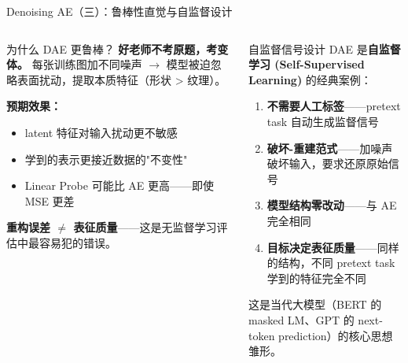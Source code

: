 \documentclass[aspectratio=169]{ctexbeamer}
\begin{document}
\begin{frame}[shrink=10]{Denoising AE（三）：鲁棒性直觉与自监督设计}
\small

\begin{columns}[T]
\begin{alertblock}{为什么 DAE 更鲁棒？}
\footnotesize
\textbf{好老师不考原题，考变体。} 每张训练图加不同噪声 $\to$ 模型被迫忽略表面扰动，提取本质特征（形状 > 纹理）。

\textbf{预期效果：}
\begin{itemize}
  \item latent 特征对输入扰动更不敏感
  \item 学到的表示更接近数据的"不变性"
  \item Linear Probe 可能比 AE 更高——即使 MSE 更差
\end{itemize}

\textbf{重构误差 $\neq$ 表征质量}——这是无监督学习评估中最容易犯的错误。
\end{alertblock}

\begin{block}{自监督信号设计}
\footnotesize
DAE 是\textbf{自监督学习 (Self-Supervised Learning)} 的经典案例：

\begin{enumerate}
  \item \textbf{不需要人工标签}——pretext task 自动生成监督信号
  \item \textbf{破坏-重建范式}——加噪声破坏输入，要求还原原始信号
  \item \textbf{模型结构零改动}——与 AE 完全相同
  \item \textbf{目标决定表征质量}——同样的结构，不同 pretext task 学到的特征完全不同
\end{enumerate}

这是当代大模型（BERT 的 masked LM、GPT 的 next-token prediction）的核心思想雏形。
\end{block}
\end{columns}
\end{frame}
\end{document}
